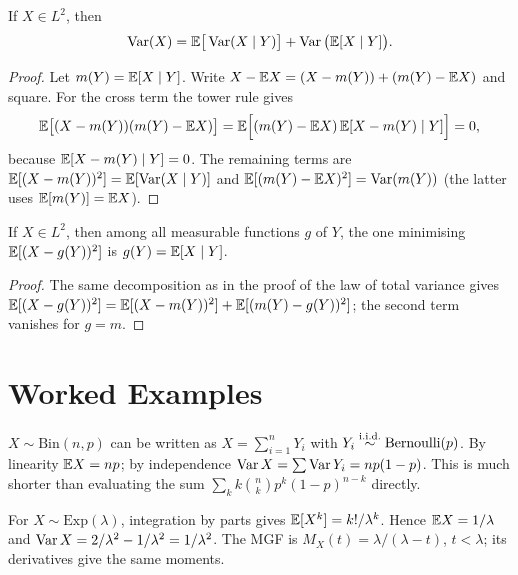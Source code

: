 \documentclass[main.tex]{subfiles}
\begin{document}
\begin{theorem}\label{thm:toplam-varyans}
If $X\in L^2$, then
\[
\operatorname{Var}(X)=\mathbb{E}\big[\operatorname{Var}(X\mid Y)\big]+\operatorname{Var}\big(\mathbb{E}[X\mid Y]\big).
\]
\end{theorem}
\begin{proof}
Let $m(Y)=\mathbb{E}[X\mid Y]$. Write $X-\mathbb{E} X=(X-m(Y))+(m(Y)-\mathbb{E} X)$ and square. For the cross term the tower rule gives
\[
\mathbb{E}\big[(X-m(Y))(m(Y)-\mathbb{E} X)\big]=\mathbb{E}\Big[(m(Y)-\mathbb{E} X)\,\mathbb{E}[X-m(Y)\mid Y]\Big]=0,
\]
because $\mathbb{E}[X-m(Y)\mid Y]=0$. The remaining terms are $\mathbb{E}[(X-m(Y))^2]=\mathbb{E}[\operatorname{Var}(X\mid Y)]$ and $\mathbb{E}[(m(Y)-\mathbb{E} X)^2]=\operatorname{Var}(m(Y))$ (the latter uses $\mathbb{E}[m(Y)]=\mathbb{E} X$).
\end{proof}

\begin{corollary}\label{cor:en-iyi-kestirici}
If $X\in L^2$, then among all measurable functions $g$ of $Y$, the one minimising $\mathbb{E}[(X-g(Y))^2]$ is $g(Y)=\mathbb{E}[X\mid Y]$.
\end{corollary}
\begin{proof}
The same decomposition as in the proof of the law of total variance gives $\mathbb{E}[(X-g(Y))^2]=\mathbb{E}[(X-m(Y))^2]+\mathbb{E}[(m(Y)-g(Y))^2]$; the second term vanishes for $g=m$.
\end{proof}

\section{Worked Examples}

\begin{example}
$X\sim\text{Bin}(n,p)$ can be written as $X=\sum_{i=1}^n Y_i$ with $Y_i\overset{\text{i.i.d.}}{\sim}\text{Bernoulli}(p)$. By linearity $\mathbb{E} X=np$; by independence $\operatorname{Var} X=\sum\operatorname{Var} Y_i=np(1-p)$. This is much shorter than evaluating the sum $\sum_k k\binom nk p^k(1-p)^{n-k}$ directly.
\end{example}

\begin{example}
For $X\sim\text{Exp}(\lambda)$, integration by parts gives $\mathbb{E}[X^k]=k!/\lambda^k$. Hence $\mathbb{E} X=1/\lambda$ and $\operatorname{Var} X=2/\lambda^2-1/\lambda^2=1/\lambda^2$. The MGF is $M_X(t)=\lambda/(\lambda-t)$, $t<\lambda$; its derivatives give the same moments.
\end{example}
\end{document}
